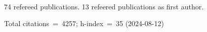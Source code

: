 74 refereed publications. 13 refeered publications as first author.

Total citations~=~4257; h-index~=~35 (2024-08-12)